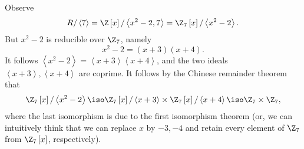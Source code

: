 \documentclass[pmath441]{subfiles}
\begin{document}
    \begin{answer}
        Observe
        \begin{equation*}
            R /\left< 7 \right> = \Z\left[ x \right] / \left< x^{2}-2,7 \right> = \Z_7\left[ x \right] / \left< x^{2}-2 \right>.   
        \end{equation*}
        But $x^{2}-2$ is reducible over $\Z_7$, namely
        \begin{equation*}
            x^{2}-2 = \left( x+3 \right)\left( x+4 \right).
        \end{equation*}
        It follows $\left< x^{2}-2 \right> = \left< x+3 \right>\left< x+4 \right>$, and the two ideals $\left< x+3 \right>,\left< x+4 \right>$ are coprime. It follows by the Chinese remainder theorem that
        \begin{equation}
            \Z_7\left[ x \right] / \left< x^{2}-2 \right> \iso \Z_7\left[ x \right] / \left< x+3 \right> \times \Z_7\left[ x \right] / \left< x+4 \right> \iso \Z_7\times\Z_7,  
        \end{equation}
        where the last isomorphism is due to the first isomorphism theorem (or, we can intuitively think that we can replace $x$ by $-3,-4$ and retain every element of $\Z_7$ from $\Z_7\left[ x \right]$, respectively).


\end{answer}
\end{document}
